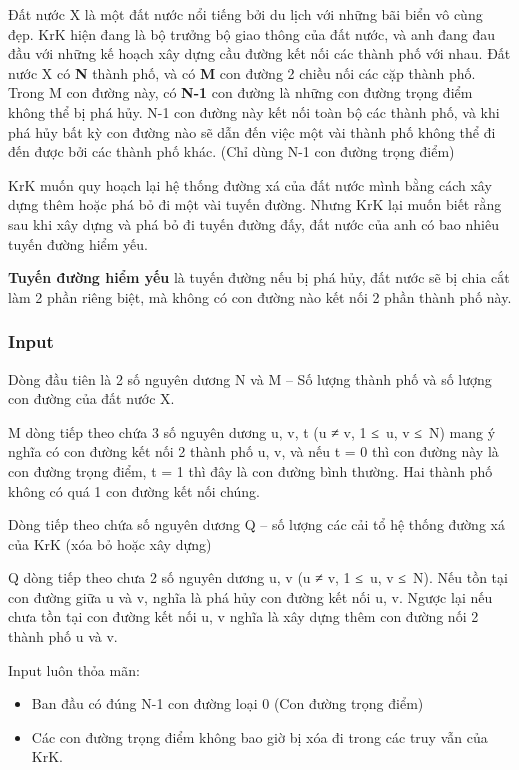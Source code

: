 





   Đất nước X là một đất nước nổi tiếng bởi du lịch với những bãi biển vô cùng đẹp. KrK hiện đang là bộ trưởng bộ giao thông của đất nước, và anh đang đau đầu với những kế hoạch xây dựng cầu đường kết nối các thành phố với nhau. Đất nước X có   \textbf{    N   }   thành phố, và có   \textbf{    M   }   con đường 2 chiều nối các cặp thành phố. Trong M con đường này, có   \textbf{    N-1   }   con đường là những con đường trọng điểm không thể bị phá hủy. N-1 con đường này kết nối toàn bộ các thành phố, và khi phá hủy bất kỳ con đường nào sẽ dẫn đến việc một vài thành phố không thể đi đến được bởi các thành phố khác. (Chỉ dùng N-1 con đường trọng điểm)  

   KrK muốn quy hoạch lại hệ thống đường xá của đất nước mình bằng cách xây dựng thêm hoặc phá bỏ đi một vài tuyến đường. Nhưng KrK lại muốn biết rằng sau khi xây dựng và phá bỏ đi tuyến đường đấy, đất nước của anh có bao nhiêu tuyến đường hiểm yếu.  

\textbf{    Tuyến đường hiểm yếu   }   là tuyến đường nếu bị phá hủy, đất nước sẽ bị chia cắt làm 2 phần riêng biệt, mà không có con đường nào kết nối 2 phần thành phố này.  

\subsubsection{   Input  }

   Dòng đầu tiên là 2 số nguyên dương N và M – Số lượng thành phố và số lượng con đường của đất nước X.  

   M dòng tiếp theo chứa 3 số nguyên dương u, v, t (u ≠ v, 1 ≤ u, v ≤ N) mang ý nghĩa có con đường kết nối 2 thành phố u, v, và nếu t = 0 thì con đường này là con đường trọng điểm, t = 1 thì đây là con đường bình thường. Hai thành phố không có quá 1 con đường kết nối chúng.  

   Dòng tiếp theo chứa số nguyên dương Q – số lượng các cải tổ hệ thống đường xá của KrK (xóa bỏ hoặc xây dựng)  

   Q dòng tiếp theo chưa 2 số nguyên dương u, v (u ≠ v, 1 ≤ u, v ≤ N). Nếu tồn tại con đường giữa u và v, nghĩa là phá hủy con đường kết nối u, v. Ngược lại nếu chưa tồn tại con đường kết nối u, v nghĩa là xây dựng thêm con đường nối 2 thành phố u và v.  

   Input luôn thỏa mãn:  
\begin{itemize}
	\item     Ban đầu có đúng N-1 con đường loại 0 (Con đường trọng điểm)   
	\item     Các con đường trọng điểm không bao giờ bị xóa đi trong các truy vẫn của KrK.   
\end{itemize}

